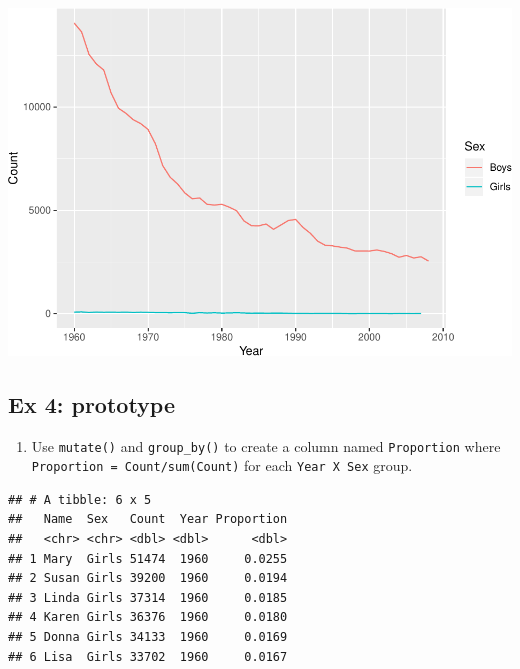 \documentclass[]{book}
\newenvironment{Shaded}{\begin{snugshade}}{\end{snugshade}}
\newcommand{\KeywordTok}[1]{\textcolor[rgb]{0.13,0.29,0.53}{\textbf{#1}}}
\newcommand{\DataTypeTok}[1]{\textcolor[rgb]{0.13,0.29,0.53}{#1}}
\newcommand{\StringTok}[1]{\textcolor[rgb]{0.31,0.60,0.02}{#1}}
\newcommand{\OperatorTok}[1]{\textcolor[rgb]{0.81,0.36,0.00}{\textbf{#1}}}
\newcommand{\NormalTok}[1]{#1}
\providecommand{\tightlist}{%
  \setlength{\itemsep}{0pt}\setlength{\parskip}{0pt}}
\begin{document}
\includegraphics{R/Rintro/figures/unnamed-chunk-71-1.pdf}

\subsection{Ex 4: prototype}\label{ex-4-prototype}

\begin{enumerate}
\def\labelenumi{\arabic{enumi}.}
\tightlist
\item
  Use \texttt{mutate()} and \texttt{group\_by()} to create a column
  named \texttt{Proportion} where
  \texttt{Proportion\ =\ Count/sum(Count)} for each
  \texttt{Year\ X\ Sex} group.
\end{enumerate}

\begin{Shaded}
\end{Shaded}

\begin{verbatim}
## # A tibble: 6 x 5
##   Name  Sex   Count  Year Proportion
##   <chr> <chr> <dbl> <dbl>      <dbl>
## 1 Mary  Girls 51474  1960     0.0255
## 2 Susan Girls 39200  1960     0.0194
## 3 Linda Girls 37314  1960     0.0185
## 4 Karen Girls 36376  1960     0.0180
## 5 Donna Girls 34133  1960     0.0169
## 6 Lisa  Girls 33702  1960     0.0167
\end{verbatim}
\end{document}
